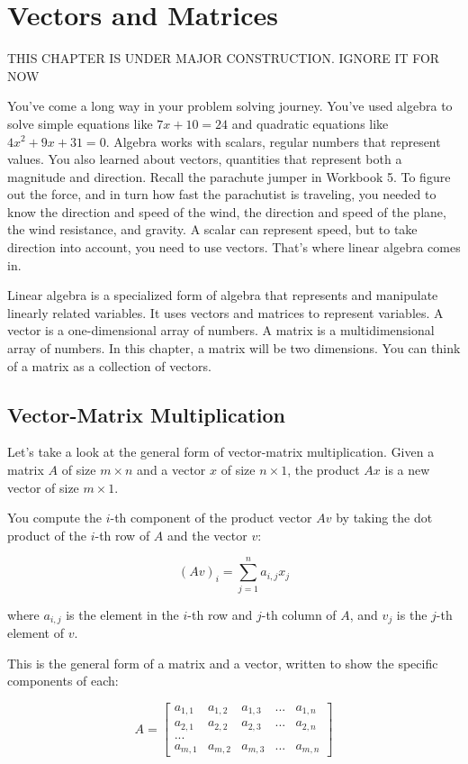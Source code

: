 \chapter{Vectors and Matrices}

THIS CHAPTER IS UNDER MAJOR CONSTRUCTION. IGNORE IT FOR NOW


You've come a long way in your problem solving journey. You've used algebra to solve simple equations like $7x + 10 = 24$ and quadratic equations like $4x^{2} + 9x + 31 = 0$. Algebra works with scalars, regular numbers that represent values. You also learned about vectors, quantities that represent both a magnitude and direction. Recall the parachute jumper in Workbook 5. To figure out the force, and in turn how fast the parachutist is traveling, you needed to know the direction and speed of the wind, the direction and speed of the plane, the wind resistance, and gravity. A scalar can represent speed, but to take direction into account, you need to use vectors. That's where linear algebra comes in.    

Linear algebra is a specialized form of algebra that represents and manipulate linearly related variables. It uses vectors and matrices to represent variables. A vector is a one-dimensional array of numbers. A matrix is a multidimensional array of numbers. In this chapter, a matrix will be two dimensions. You can think of a matrix as a collection of vectors. 


\section{Vector-Matrix Multiplication}
Let's take a look at the general form of vector-matrix multiplication. Given a matrix $A$ of size $m \times n$ and a vector $x$ of size $n \times 1$, the product $Ax$ is a new vector of size $m \times 1$. 

You compute the $i$-th component of the product vector $Av$ by taking the dot product of the $i$-th row of $A$ and the vector $v$:

\begin{equation*}
(Av)_i = \sum_{j=1}^n a_{i,j}x_j
\end{equation*}

where $a_{i,j}$ is the element in the $i$-th row and $j$-th column of $A$, and $v_j$ is the $j$-th element of $v$.

This is the general form of a matrix and a vector, written to show the specific components of each:


 $$A = \begin{bmatrix}
 a_{1,1} & a_{1,2}  & a_{1,3} & ... & a_{1,n}  \\
 a_{2,1} & a_{2,2}  & a_{2,3} & ... & a_{2,n}  \\
 ... \\
 a_{m,1} & a_{m,2}  & a_{m,3} & ... & a_{m,n}  
\end{bmatrix}$$

